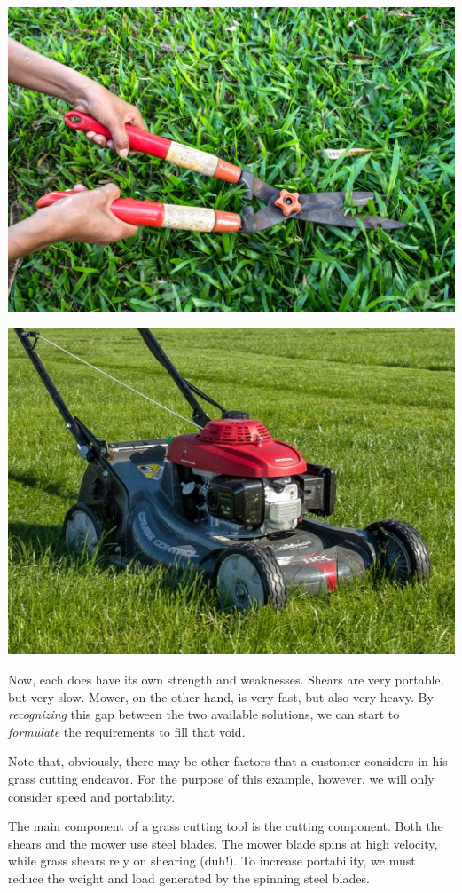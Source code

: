 \documentclass[a4paper,openany,nobib]{tufte-book}
\begin{document}
\begin{center}
\includegraphics[width=.9\linewidth]{pictures/intro-eng-design/grass-shears.jpg}
\end{center}
\begin{center}
\includegraphics[width=.9\linewidth]{pictures/intro-eng-design/lawn-mower.jpg}
\end{center}

Now, each does have its own strength and weaknesses. Shears are very
portable, but very slow. Mower, on the other hand, is very fast, but
also very heavy. By \emph{recognizing} this gap between the two available
solutions, we can start to \emph{formulate} the requirements to fill that
void.


Note that, obviously, there may be other factors that a customer
considers in his grass cutting endeavor. For the purpose of this
example, however, we will only consider speed and portability.

The main component of a grass cutting tool is the cutting component.
Both the shears and the mower use steel blades. The mower blade spins at
high velocity, while grass shears rely on shearing (duh!). To increase
portability, we must reduce the weight and load generated by the
spinning steel blades.
\end{document}

